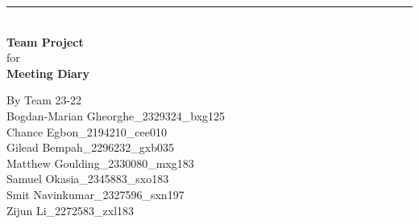 \documentclass[a4paper]{article}
\begin{document}

\begin{titlepage}
	
	\rule{\linewidth}{5pt}
	\raggedleft
	\fontsize{38pt}{50pt}\selectfont
    \textbf{\\Team Project\\}
    \fontsize{28pt}{60pt}\selectfont 
    for\\
    \fontsize{38pt}{60pt}\selectfont 
    \textbf{Meeting Diary\\}
	
	\vfill %
	
	
	\parbox[t]{0.93\textwidth}{ %
		\raggedleft %
		\large %
		{\Large By Team 23-22}\\[4pt] %
		Bogdan-Marian Gheorghe\_2329324\_bxg125\\
		Chance Egbon\_2194210\_cee010\\
		Gilead Bempah\_2296232\_gxb035\\
		Matthew Goulding\_2330080\_mxg183\\
		Samuel Okasia\_2345883\_sxo183\\
		Smit Navinkumar\_2327596\_sxn197\\
		Zijun Li\_2272583\_zxl183\\
	}
	
\end{titlepage}
\end{document}
